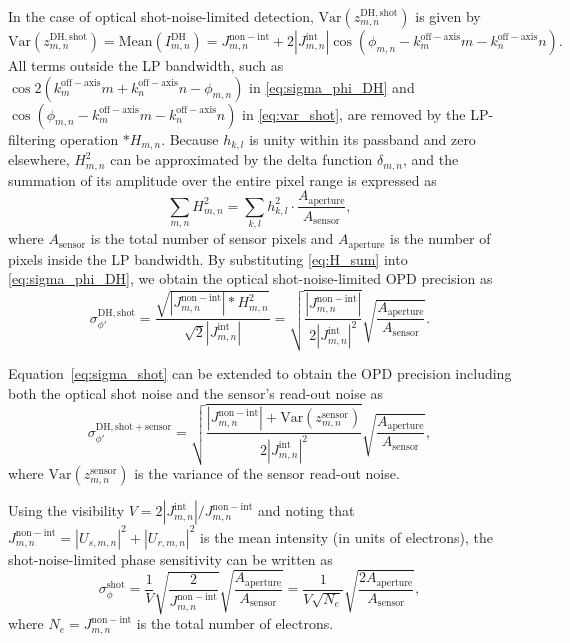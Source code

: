 In the case of optical shot-noise-limited detection, $\mathrm{Var}(z_{m,n}^{\mathrm{DH,shot}})$ is given by
\begin{equation}
\label{eq:var_shot}
\mathrm{Var}(z_{m,n}^{\mathrm{DH,shot}}) = \mathrm{Mean}(I_{m,n}^{\mathrm{DH}}) = J_{m,n}^{\mathrm{non-int}} + 2|J_{m,n}^{\mathrm{int}}| \cos(\phi_{m,n} - k_m^{\mathrm{off-axis}}m - k_n^{\mathrm{off-axis}}n).
\end{equation}
All terms outside the LP bandwidth, such as $\cos 2(k_m^{\mathrm{off-axis}}m + k_n^{\mathrm{off-axis}}n - \phi_{m,n})$ in \eqref{eq:sigma_phi_DH} and $\cos(\phi_{m,n} - k_m^{\mathrm{off-axis}}m - k_n^{\mathrm{off-axis}}n)$ in \eqref{eq:var_shot}, are removed by the LP-filtering operation $\ast H_{m,n}$. Because $h_{k,l}$ is unity within its passband and zero elsewhere, $H_{m,n}^2$ can be approximated by the delta function $\delta_{m,n}$, and the summation of its amplitude over the entire pixel range is expressed as
\begin{equation}
\label{eq:H_sum}
\sum_{m,n} H_{m,n}^2 = \sum_{k,l} h_{k,l}^2 \cdot \frac{A_{\mathrm{aperture}}}{A_{\mathrm{sensor}}},
\end{equation}
where $A_{\mathrm{sensor}}$ is the total number of sensor pixels and $A_{\mathrm{aperture}}$ is the number of pixels inside the LP bandwidth. By substituting \eqref{eq:H_sum} into \eqref{eq:sigma_phi_DH}, we obtain the optical shot-noise-limited OPD precision as
\begin{equation}
\label{eq:sigma_shot}
\sigma_{\phi'}^{\mathrm{DH,shot}} = \frac{\sqrt{|J_{m,n}^{\mathrm{non-int}}| \ast H_{m,n}^2}}{\sqrt{2}|J_{m,n}^{\mathrm{int}}|} = \sqrt{\frac{|J_{m,n}^{\mathrm{non-int}}|}{2|J_{m,n}^{\mathrm{int}}|^2}} \sqrt{\frac{A_{\mathrm{aperture}}}{A_{\mathrm{sensor}}}}.
\end{equation}

Equation~\eqref{eq:sigma_shot} can be extended to obtain the OPD precision including both the optical shot noise and the sensor's read-out noise as
\begin{equation}
\sigma_{\phi'}^{\mathrm{DH,shot+sensor}} = \sqrt{\frac{|J_{m,n}^{\mathrm{non-int}}| + \mathrm{Var}(z_{m,n}^{\mathrm{sensor}})}{2|J_{m,n}^{\mathrm{int}}|^2}} \sqrt{\frac{A_{\mathrm{aperture}}}{A_{\mathrm{sensor}}}},
\end{equation}
where $\mathrm{Var}(z_{m,n}^{\mathrm{sensor}})$ is the variance of the sensor read-out noise.

Using the visibility $V = 2|J_{m,n}^{\mathrm{int}}|/J_{m,n}^{\mathrm{non-int}}$ and noting that $J_{m,n}^{\mathrm{non-int}} = |U_{s,m,n}|^2 + |U_{r,m,n}|^2$ is the mean intensity (in units of electrons), the shot-noise-limited phase sensitivity can be written as
\begin{equation}
\sigma_{\phi}^{\mathrm{shot}} = \frac{1}{V} \sqrt{\frac{2}{J_{m,n}^{\mathrm{non-int}}}} \sqrt{\frac{A_{\mathrm{aperture}}}{A_{\mathrm{sensor}}}} = \frac{1}{V\sqrt{N_e}} \sqrt{\frac{2A_{\mathrm{aperture}}}{A_{\mathrm{sensor}}}},
\end{equation}
where $N_e = J_{m,n}^{\mathrm{non-int}}$ is the total number of electrons.

